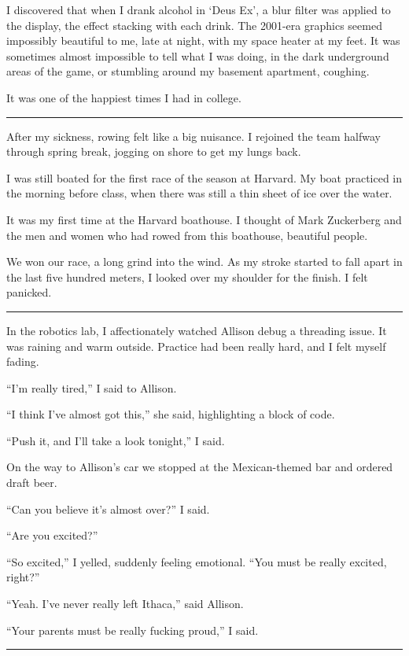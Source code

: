 I discovered that when I drank alcohol in `Deus Ex', a blur filter was applied
to the display, the effect stacking with each drink.  The 2001-era graphics
seemed impossibly beautiful to me, late at night, with my space heater at my
feet.  It was sometimes almost impossible to tell what I was doing, in the dark
underground areas of the game, or stumbling around my basement apartment,
coughing.

It was one of the happiest times I had in college.

\plainfancybreak{12pt}{2}{}

After my sickness, rowing felt like a big nuisance.  I rejoined the team halfway
through spring break, jogging on shore to get my lungs back.

I was still boated for the first race of the season at Harvard.  My boat
practiced in the morning before class, when there was still a thin sheet of ice
over the water.

It was my first time at the Harvard boathouse.  I thought of Mark Zuckerberg and
the men and women who had rowed from this boathouse, beautiful people.

We won our race, a long grind into the wind.  As my stroke started to fall apart
in the last five hundred meters, I looked over my shoulder for the finish.  I felt
panicked.

\plainfancybreak{12pt}{2}{}

In the robotics lab, I affectionately watched Allison debug a threading issue.
It was raining and warm outside.  Practice had been really hard, and I felt
myself fading.

``I'm really tired,'' I said to Allison.

``I think I've almost got this,'' she said, highlighting a block of code.

``Push it, and I'll take a look tonight,'' I said.

On the way to Allison's car we stopped at the Mexican-themed bar and ordered
draft beer.

``Can you believe it's almost over?'' I said.

``Are you excited?''

``So excited,'' I yelled, suddenly feeling emotional.  ``You must be
really excited, right?''

``Yeah.  I've never really left Ithaca,'' said Allison.

``Your parents must be really fucking proud,'' I said.

\plainfancybreak{12pt}{2}{}

